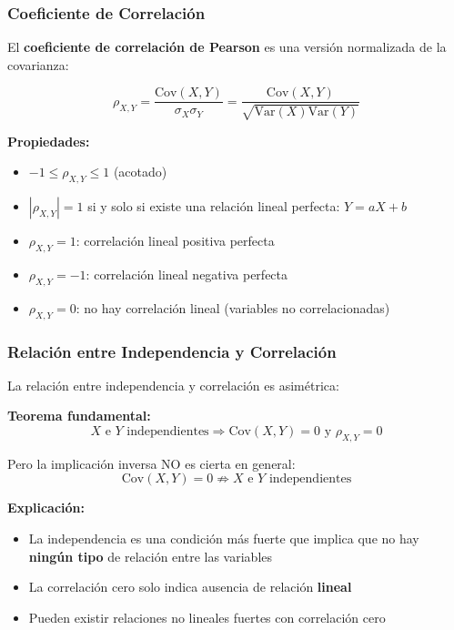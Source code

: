 \documentclass[12pt,a4paper]{article}
\begin{document}
\subsubsection{Coeficiente de Correlación}

El \textbf{coeficiente de correlación de Pearson} es una versión normalizada de la covarianza:

\begin{equation}
    \rho_{X,Y} = \frac{\mathrm{Cov}(X,Y)}{\sigma_X \sigma_Y} = \frac{\mathrm{Cov}(X,Y)}{\sqrt{\mathrm{Var}(X)\mathrm{Var}(Y)}}
\end{equation}

\textbf{Propiedades:}
\begin{itemize}
    \item $-1 \leq \rho_{X,Y} \leq 1$ (acotado)
    \item $|\rho_{X,Y}| = 1$ si y solo si existe una relación lineal perfecta: $Y = aX + b$
    \item $\rho_{X,Y} = 1$: correlación lineal positiva perfecta
    \item $\rho_{X,Y} = -1$: correlación lineal negativa perfecta
    \item $\rho_{X,Y} = 0$: no hay correlación lineal (variables no correlacionadas)
\end{itemize}

\subsubsection{Relación entre Independencia y Correlación}

La relación entre independencia y correlación es asimétrica:

\textbf{Teorema fundamental:}
\begin{equation}
    X \text{ e } Y \text{ independientes} \Rightarrow \mathrm{Cov}(X,Y) = 0 \text{ y } \rho_{X,Y} = 0
\end{equation}

Pero la implicación inversa NO es cierta en general:
\begin{equation}
    \mathrm{Cov}(X,Y) = 0 \not\Rightarrow X \text{ e } Y \text{ independientes}
\end{equation}

\textbf{Explicación:}
\begin{itemize}
    \item La independencia es una condición más fuerte que implica que no hay \textbf{ningún tipo} de relación entre las variables
    \item La correlación cero solo indica ausencia de relación \textbf{lineal}
    \item Pueden existir relaciones no lineales fuertes con correlación cero
\end{itemize}
\end{document}
